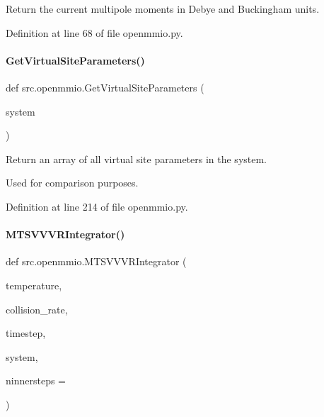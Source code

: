 Return the current multipole moments in Debye and Buckingham units. 



Definition at line 68 of file openmmio.\+py.

\mbox{\label{namespacesrc_1_1openmmio_a33ffd85523d8820df033185c58938001}} 
\paragraph{\texorpdfstring{Get\+Virtual\+Site\+Parameters()}{GetVirtualSiteParameters()}}
{\footnotesize\ttfamily def src.\+openmmio.\+Get\+Virtual\+Site\+Parameters (\begin{DoxyParamCaption}\item[{}]{system }\end{DoxyParamCaption})}



Return an array of all virtual site parameters in the system. 

Used for comparison purposes. 

Definition at line 214 of file openmmio.\+py.

\mbox{\label{namespacesrc_1_1openmmio_aa8e806e2d494fc1c36153e8523ba99ff}} 
\paragraph{\texorpdfstring{M\+T\+S\+V\+V\+V\+R\+Integrator()}{MTSVVVRIntegrator()}}
{\footnotesize\ttfamily def src.\+openmmio.\+M\+T\+S\+V\+V\+V\+R\+Integrator (\begin{DoxyParamCaption}\item[{}]{temperature,  }\item[{}]{collision\+\_\+rate,  }\item[{}]{timestep,  }\item[{}]{system,  }\item[{}]{ninnersteps = {} }\end{DoxyParamCaption})}




